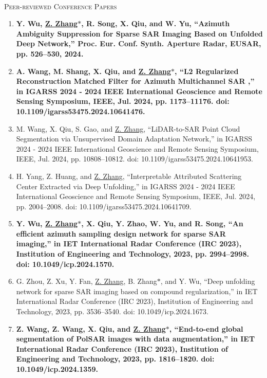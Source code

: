 \documentclass[paper=a4,fontsize=11pt]{scrartcl}
\begin{document}
~\\

\textsc{Peer-reviewed Conference Papers}

\begin{enumerate}
	
	\item \textbf{Y. Wu, \underline{Z. Zhang$\ast$}, R. Song, X. Qiu, and W. Yu, ``Azimuth Ambiguity Suppression for Sparse SAR Imaging Based on Unfolded Deep Network,'' Proc. Eur. Conf. Synth. Aperture Radar, EUSAR, pp. 526–530, 2024.}
	
	\item \textbf{A. Wang, M. Shang, X. Qiu, and \underline{Z. Zhang$\ast$}, ``L2 Regularized Reconstruction Matched Filter for Azimuth Multichannel SAR ,'' in IGARSS 2024 - 2024 IEEE International Geoscience and Remote Sensing Symposium, IEEE, Jul. 2024, pp. 1173–11176. doi: 10.1109/igarss53475.2024.10641476.}
	
	\item M. Wang, X. Qiu, S. Gao, and \underline{Z. Zhang}, ``LiDAR-to-SAR Point Cloud Segmentation via Unsupervised Domain Adaptation Network,'' in IGARSS 2024 - 2024 IEEE International Geoscience and Remote Sensing Symposium, IEEE, Jul. 2024, pp. 10808–10812. doi: 10.1109/igarss53475.2024.10641953.
	
	\item H. Yang, Z. Huang, and \underline{Z. Zhang}, ``Interpretable Attributed Scattering Center Extracted via Deep Unfolding,'' in IGARSS 2024 - 2024 IEEE International Geoscience and Remote Sensing Symposium, IEEE, Jul. 2024, pp. 2004–2008. doi: 10.1109/igarss53475.2024.10641709.
	
	\item \textbf{Y. Wu, \underline{Z. Zhang$\ast$}, X. Qiu, Y. Zhao, W. Yu, and R. Song, ``An efficient azimuth sampling design network for sparse SAR imaging,'' in IET International Radar Conference (IRC 2023), Institution of Engineering and Technology, 2023, pp. 2994–2998. doi: 10.1049/icp.2024.1570.}
	
	\item G. Zhou, Z. Xu, Y. Fan, \underline{Z. Zhang}, B. Zhang$\ast$, and Y. Wu, ``Deep unfolding network for sparse SAR imaging based on compound regularization,'' in IET International Radar Conference (IRC 2023), Institution of Engineering and Technology, 2023, pp. 3536–3540. doi: 10.1049/icp.2024.1673.
	
	\item \textbf{Z. Wang, Z. Wang, X. Qiu, and \underline{Z. Zhang$\ast$}, ``End-to-end global segmentation of PolSAR images with data augmentation,'' in IET International Radar Conference (IRC 2023), Institution of Engineering and Technology, 2023, pp. 1816–1820. doi: 10.1049/icp.2024.1359.}
	

\end{enumerate}
\end{document}
